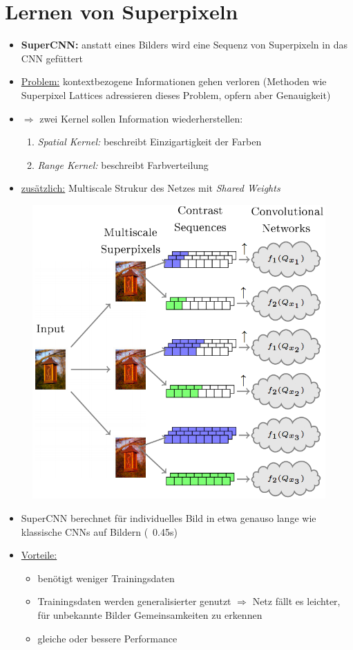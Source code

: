 \section{Lernen von Superpixeln}

\begin{itemize}
  \item \textbf{SuperCNN:} anstatt eines Bilders wird eine Sequenz von Superpixeln in das CNN gefüttert
  \item \underline{Problem:} kontextbezogene Informationen gehen verloren (Methoden wie Superpixel Lattices adressieren dieses Problem, opfern aber Genauigkeit)
  \item $\Rightarrow$ zwei Kernel sollen Information wiederherstellen:
  \begin{enumerate}
    \item \emph{Spatial Kernel:} beschreibt Einzigartigkeit der Farben
    \item \emph{Range Kernel:} beschreibt Farbverteilung
  \end{enumerate}
  \item \underline{zusätzlich:} Multiscale Strukur des Netzes mit \emph{Shared Weights}
\end{itemize}

\begin{figure}[h]
  \centering
  \includegraphics[width=.8\textwidth]{images/superpixel_learning}
\end{figure}

\begin{itemize}
  \item SuperCNN berechnet für individuelles Bild in etwa genauso lange wie klassische CNNs auf Bildern (~0.45s)
  \item \underline{Vorteile:}
  \begin{itemize}
    \item benötigt weniger Trainingsdaten
    \item Trainingsdaten werden generalisierter genutzt $\Rightarrow$ Netz fällt es leichter, für unbekannte Bilder Gemeinsamkeiten zu erkennen
    \item gleiche oder bessere Performance
  \end{itemize}
\end{itemize}
